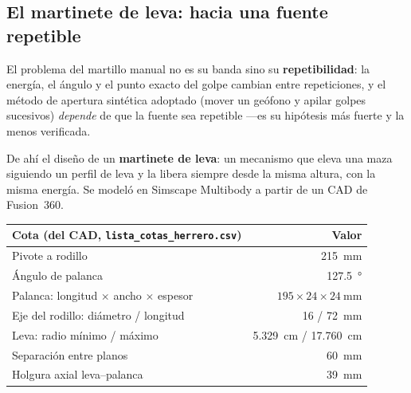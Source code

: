 
\subsection{El martinete de leva: hacia una fuente repetible}

El problema del martillo manual no es su banda sino su \textbf{repetibilidad}:
la energ\'ia, el \'angulo y el punto exacto del golpe cambian entre repeticiones,
y el m\'etodo de apertura sint\'etica adoptado (mover un ge\'ofono y apilar golpes
sucesivos) \emph{depende} de que la fuente sea repetible ---es su hip\'otesis
m\'as fuerte y la menos verificada.

De ah\'i el dise\~no de un \textbf{martinete de leva}: un mecanismo que eleva una
maza siguiendo un perfil de leva y la libera siempre desde la misma altura, con
la misma energ\'ia. Se model\'o en Simscape Multibody a partir de un CAD de
Fusion~360.

\begin{center}\footnotesize
\begin{tabular}{@{}lr@{}}
\toprule
Cota (del CAD, \texttt{lista\_cotas\_herrero.csv}) & Valor \\
\midrule
Pivote a rodillo & \SI{215}{\milli\meter} \\
\'Angulo de palanca & \SI{127.5}{\degree} \\
Palanca: longitud $\times$ ancho $\times$ espesor & $195\times24\times\SI{24}{\milli\meter}$ \\
Eje del rodillo: di\'ametro / longitud & \SI{16}{} / \SI{72}{\milli\meter} \\
Leva: radio m\'inimo / m\'aximo & \SI{5.329}{\centi\meter} / \SI{17.760}{\centi\meter} \\
Separaci\'on entre planos & \SI{60}{\milli\meter} \\
Holgura axial leva--palanca & \SI{39}{\milli\meter} \\
\bottomrule
\end{tabular}
\end{center}

